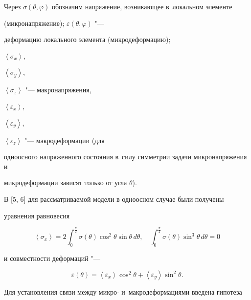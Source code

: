 Через $\sigma (\theta, \varphi)$ обозначим напряжение, возникающее в~локальном элементе

(микронапряжение); $\varepsilon (\theta, \varphi)$ "---

деформацию локального элемента (микродеформацию); 

$\left\langle \sigma_x \right\rangle $, 

$\left\langle \sigma_y \right\rangle$, 

$\left\langle \sigma_z \right\rangle $ "--- макронапряжения, 

$\left\langle \varepsilon_x \right\rangle$, 

$\left\langle \varepsilon_y \right \rangle$, 

$\left\langle \varepsilon_z \right\rangle $ "--- макродеформации (для

одноосного напряженного состояния в~силу симметрии задачи микронапряжения и

микродеформации зависят только от угла $\theta $).



В [5, 6] для рассматриваемой модели в одноосном случае были получены

уравнения равновесия

\begin{equation}

\label{andreeva:eq2}

\left\langle \sigma _x \right\rangle =

2\int_0^{\frac{\pi }{2}}

\sigma (\theta )\cos ^2\theta \sin \theta\, d\theta, \quad

\int_0^{\frac{\pi }{2}} \sigma (\theta)\sin ^3\theta \,d\theta =0 

\end{equation}

и совместности деформаций "---

\begin{equation}

\label{andreeva:eq3}

\varepsilon (\theta)=\left\langle \varepsilon _x \right\rangle 

\cos^2\theta +\left\langle \varepsilon _y  \right\rangle \sin^2\theta .

\end{equation}



Для установления связи между микро- и~макродеформациями введена гипотеза

